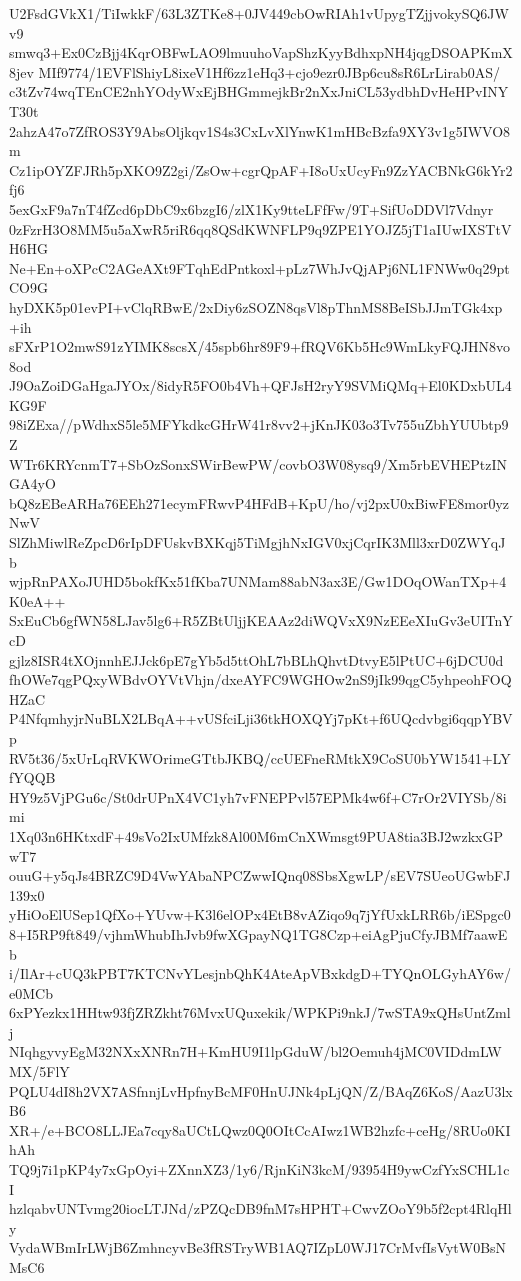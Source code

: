 U2FsdGVkX1/TiIwkkF/63L3ZTKe8+0JV449cbOwRIAh1vUpygTZjjvokySQ6JWv9
smwq3+Ex0CzBjj4KqrOBFwLAO9lmuuhoVapShzKyyBdhxpNH4jqgDSOAPKmX8jev
MIf9774/1EVFlShiyL8ixeV1Hf6zz1eHq3+cjo9ezr0JBp6cu8sR6LrLirab0AS/
c3tZv74wqTEnCE2nhYOdyWxEjBHGmmejkBr2nXxJniCL53ydbhDvHeHPvINYT30t
2ahzA47o7ZfROS3Y9AbsOljkqv1S4s3CxLvXlYnwK1mHBcBzfa9XY3v1g5IWVO8m
Cz1ipOYZFJRh5pXKO9Z2gi/ZsOw+cgrQpAF+I8oUxUcyFn9ZzYACBNkG6kYr2fj6
5exGxF9a7nT4fZcd6pDbC9x6bzgI6/zlX1Ky9tteLFfFw/9T+SifUoDDVl7Vdnyr
0zFzrH3O8MM5u5aXwR5riR6qq8QSdKWNFLP9q9ZPE1YOJZ5jT1aIUwIXSTtVH6HG
Ne+En+oXPcC2AGeAXt9FTqhEdPntkoxl+pLz7WhJvQjAPj6NL1FNWw0q29ptCO9G
hyDXK5p01evPI+vClqRBwE/2xDiy6zSOZN8qsVl8pThnMS8BeISbJJmTGk4xp+ih
sFXrP1O2mwS91zYIMK8scsX/45spb6hr89F9+fRQV6Kb5Hc9WmLkyFQJHN8vo8od
J9OaZoiDGaHgaJYOx/8idyR5FO0b4Vh+QFJsH2ryY9SVMiQMq+El0KDxbUL4KG9F
98iZExa//pWdhxS5le5MFYkdkcGHrW41r8vv2+jKnJK03o3Tv755uZbhYUUbtp9Z
WTr6KRYcnmT7+SbOzSonxSWirBewPW/covbO3W08ysq9/Xm5rbEVHEPtzINGA4yO
bQ8zEBeARHa76EEh271ecymFRwvP4HFdB+KpU/ho/vj2pxU0xBiwFE8mor0yzNwV
SlZhMiwlReZpcD6rIpDFUskvBXKqj5TiMgjhNxIGV0xjCqrIK3Mll3xrD0ZWYqJb
wjpRnPAXoJUHD5bokfKx51fKba7UNMam88abN3ax3E/Gw1DOqOWanTXp+4K0eA++
SxEuCb6gfWN58LJav5lg6+R5ZBtUljjKEAAz2diWQVxX9NzEEeXIuGv3eUITnYcD
gjlz8ISR4tXOjnnhEJJck6pE7gYb5d5ttOhL7bBLhQhvtDtvyE5lPtUC+6jDCU0d
fhOWe7qgPQxyWBdvOYVtVhjn/dxeAYFC9WGHOw2nS9jIk99qgC5yhpeohFOQHZaC
P4NfqmhyjrNuBLX2LBqA++vUSfciLji36tkHOXQYj7pKt+f6UQcdvbgi6qqpYBVp
RV5t36/5xUrLqRVKWOrimeGTtbJKBQ/ccUEFneRMtkX9CoSU0bYW1541+LYfYQQB
HY9z5VjPGu6c/St0drUPnX4VC1yh7vFNEPPvl57EPMk4w6f+C7rOr2VIYSb/8imi
1Xq03n6HKtxdF+49sVo2IxUMfzk8Al00M6mCnXWmsgt9PUA8tia3BJ2wzkxGPwT7
ouuG+y5qJs4BRZC9D4VwYAbaNPCZwwIQnq08SbsXgwLP/sEV7SUeoUGwbFJ139x0
yHiOoElUSep1QfXo+YUvw+K3l6elOPx4EtB8vAZiqo9q7jYfUxkLRR6b/iESpgc0
8+I5RP9ft849/vjhmWhubIhJvb9fwXGpayNQ1TG8Czp+eiAgPjuCfyJBMf7aawEb
i/IlAr+cUQ3kPBT7KTCNvYLesjnbQhK4AteApVBxkdgD+TYQnOLGyhAY6w/e0MCb
6xPYezkx1HHtw93fjZRZkht76MvxUQuxekik/WPKPi9nkJ/7wSTA9xQHsUntZmlj
NIqhgyvyEgM32NXxXNRn7H+KmHU9I1lpGduW/bl2Oemuh4jMC0VIDdmLWMX/5FlY
PQLU4dI8h2VX7ASfnnjLvHpfnyBcMF0HnUJNk4pLjQN/Z/BAqZ6KoS/AazU3lxB6
XR+/e+BCO8LLJEa7cqy8aUCtLQwz0Q0OItCcAIwz1WB2hzfc+ceHg/8RUo0KIhAh
TQ9j7i1pKP4y7xGpOyi+ZXnnXZ3/1y6/RjnKiN3kcM/93954H9ywCzfYxSCHL1cI
hzlqabvUNTvmg20iocLTJNd/zPZQcDB9fnM7sHPHT+CwvZOoY9b5f2cpt4RlqHly
VydaWBmIrLWjB6ZmhncyvBe3fRSTryWB1AQ7IZpL0WJ17CrMvfIsVytW0BsNMsC6
